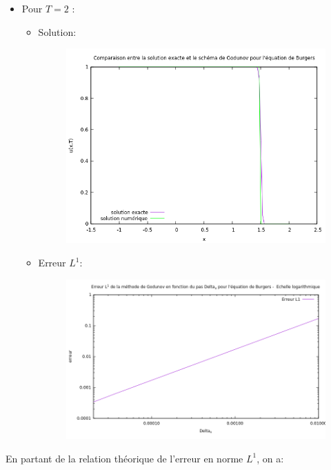\begin{itemize}
\begin{itemize}
\end{itemize}

\item Pour $T = 2$ : 

\begin{itemize}

\item Solution: 

\begin{figure}[h!]
	\centering \includegraphics[scale=0.7]{Images_Fichiers/burgers3.png}
\end{figure}

\item Erreur $L^1$: 

\begin{figure}[h!]
	\centering \includegraphics[scale=0.7]{Images_Fichiers/berreur3.png}
\end{figure}

\end{itemize}
\end{itemize}
\newpage
En partant de la relation th\'eorique de l'erreur en norme $L^1$, on a:

